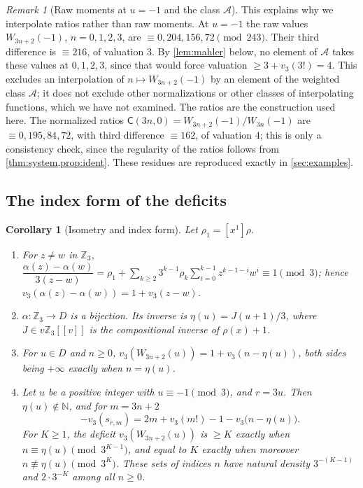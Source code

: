 \documentclass[11pt,reqno]{amsart}
\newtheorem{corollary}[theorem]{Corollary}
\theoremstyle{definition}
\theoremstyle{remark}
\newtheorem{remark}[theorem]{Remark}
\theoremstyle{plain}
\newcommand{\Z}{\mathbb Z}
\newcommand{\N}{\mathbb N}
\newcommand{\sC}{\mathsf C}
\newcommand{\cA}{\mathcal A}
\begin{document}
\begin{remark}[Raw moments at $u=-1$ and the class $\cA$]\label{rem:raw}
This explains why we interpolate ratios rather than raw moments. At $u=-1$ the raw values $W_{3n+2}(-1)$, $n=0,1,2,3$, are $\equiv0,204,156,72\pmod{243}$. Their third difference is $\equiv216$, of valuation $3$. By \cref{lem:mahler} below, no element of $\cA$ takes these values at $0,1,2,3$, since that would force valuation $\ge3+v_3(3!)=4$. This excludes an interpolation of $n\mapsto W_{3n+2}(-1)$ by an element of the weighted class $\cA$; it does not exclude other normalizations or other classes of interpolating functions, which we have not examined. The ratios are the construction used here. The normalized ratios $\sC(3n,0)=W_{3n+2}(-1)/W_{3n}(-1)$ are $\equiv0,195,84,72$, with third difference $\equiv162$, of valuation $4$; this is only a consistency check, since the regularity of the ratios follows from \cref{thm:system,prop:ident}. These residues are reproduced exactly in \cref{sec:examples}.
\end{remark}

\subsection{The index form of the deficits}

\begin{corollary}[Isometry and index form]\label{cor:index}
Let $\rho_1=[x^1]\rho$.
\begin{enumerate}[label=\textup{(\roman*)}]
\item For $z\ne w$ in $\Z_3$, $\dfrac{\alpha(z)-\alpha(w)}{3(z-w)}=\rho_1+\sum_{k\ge2}3^{k-1}\rho_k\sum_{i=0}^{k-1}z^{k-1-i}w^i\equiv1\pmod 3$; hence $v_3(\alpha(z)-\alpha(w))=1+v_3(z-w)$.
\item $\alpha\colon\Z_3\to D$ is a bijection. Its inverse is $\eta(u)=J(u+1)/3$, where $J\in v\Z_3[[v]]$ is the compositional inverse of $\rho(x)+1$.
\item For $u\in D$ and $n\ge0$, $v_3(W_{3n+2}(u))=1+v_3(n-\eta(u))$, both sides being $+\infty$ exactly when $n=\eta(u)$.
\item Let $u$ be a positive integer with $u\equiv-1\pmod 3$, and $r=3u$. Then $\eta(u)\notin\N$, and for $m=3n+2$
\[
-v_3(s_{r,m})=2m+v_3(m!)-1-v_3\bigl(n-\eta(u)\bigr).
\]
For $K\ge1$, the deficit $v_3(W_{3n+2}(u))$ is $\ge K$ exactly when $n\equiv\eta(u)\pmod{3^{K-1}}$, and equal to $K$ exactly when moreover $n\not\equiv\eta(u)\pmod{3^K}$. These sets of indices $n$ have natural density $3^{-(K-1)}$ and $2\cdot3^{-K}$ among all $n\ge0$.
\end{enumerate}
\end{corollary}
\end{document}
